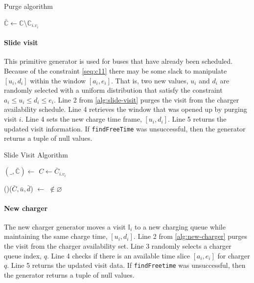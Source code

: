 \documentclass[11pt,a4paper,final]{article}
\newcommand{\I}{\mathbb{I}}                 %
\newcommand{\C}{\mathbb{C}}                 %
\newcommand{\Sol}{\mathbb{S}}               %
\begin{document}
\begin{algorithm}[H]
  \caption{Purge algorithm} \label{alg:purge}
    \LinesNumbered
    \KwIn{$\Sol$}
    \KwOut{$\bar{\Sol}$}

    \Begin
    {
        $\bar{\C} \leftarrow \C \setminus \C_{i.v_i}$
        \Return{$(\_, \bar{\C})$}
    }
  \end{algorithm}

\paragraph{Slide visit}
\label{slide-visit}
This primitive generator is used for buses that have already been scheduled. Because of the constraint \ref{seq:c11}
there may be some slack to manipulate \([u_i, d_i]\) within the window \([a_i, e_i]\). That is, two new values, \(u_i\) and
\(d_i\) are randomly selected with a uniform distribution that satisfy the constraint \(a_i \leq u_i \leq d_i \leq e_i\). Line 2 from
\ref{alg:slide-visit} purges the visit from the charger availability schedule. Line 4 retrieves the window that was
opened up by purging visit \(i\). Line 4 sets the new charge time frame, \([u_i, d_i]\). Line 5 returns the updated visit
information. If \texttt{findFreeTime} was unsuccessful, then the generator returns a tuple of null values.

\begin{algorithm}[H]
  \caption{Slide Visit Algorithm} \label{alg:slide-visit}
  \LinesNumbered
  \KwIn{$\Sol$}
  \KwOut{$\bar{\Sol}$}


    \Begin
    {
      $(\_, \bar{\C}) \leftarrow$\Purge{$\Sol$}
      $C \leftarrow \bar{C}_{i.v_i}$

        \If(){($\bar{C}, \bar{u}, \bar{d}$) $\leftarrow$ \findFreeTime{$C$, $\I_{i.a}, \I_{i.e}$} $\not\in \varnothing$}
        {
          \Return{($\_, (\I_{i.v_i},\bar{u},\bar{d}),\bar{C}$)}
        }

        \Return{($\varnothing$)}
    }
  \end{algorithm}

\paragraph{New charger}
\label{new-charger}
The new charger generator moves a visit \(\I_i\) to a new charging queue while maintaining the same charge time, \([u_i,
d_i]\). Line 2 from \ref{alg:new-charger} purges the visit from the charger availability set. Line 3 randomly selects a
charger queue index, \(q\). Line 4 checks if there is an available time slice \([a_i, e_i]\) for charger \(q\). Line 5 returns
the updated visit data. If \texttt{findFreetime} was unsuccessful, then the generator returns a tuple of null values.
\end{document}
